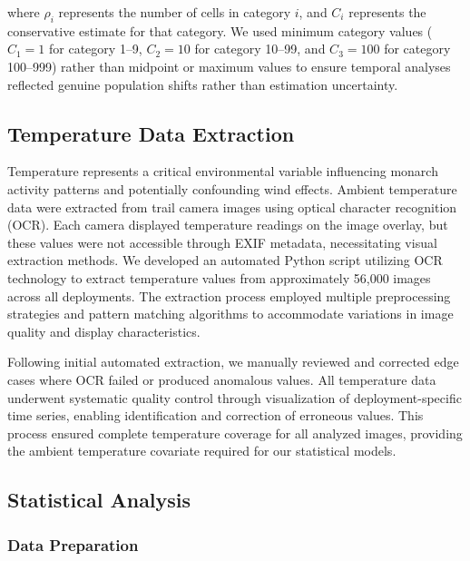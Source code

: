 where $\rho_i$ represents the number of cells in category $i$, and $C_i$ represents the conservative estimate for that category. We used minimum category values ($C_1 = 1$ for category 1–9, $C_2 = 10$ for category 10–99, and $C_3 = 100$ for category 100–999) rather than midpoint or maximum values to ensure temporal analyses reflected genuine population shifts rather than estimation uncertainty.

\subsection{Temperature Data Extraction}

Temperature represents a critical environmental variable influencing monarch activity patterns and potentially confounding wind effects. Ambient temperature data were extracted from trail camera images using optical character recognition (OCR). Each camera displayed temperature readings on the image overlay, but these values were not accessible through EXIF metadata, necessitating visual extraction methods. We developed an automated Python script utilizing OCR technology to extract temperature values from approximately 56,000 images across all deployments. The extraction process employed multiple preprocessing strategies and pattern matching algorithms to accommodate variations in image quality and display characteristics.

Following initial automated extraction, we manually reviewed and corrected edge cases where OCR failed or produced anomalous values. All temperature data underwent systematic quality control through visualization of deployment-specific time series, enabling identification and correction of erroneous values. This process ensured complete temperature coverage for all analyzed images, providing the ambient temperature covariate required for our statistical models.

\subsection{Statistical Analysis}
\label{sec:statistical-analysis}

\subsubsection{Data Preparation}

